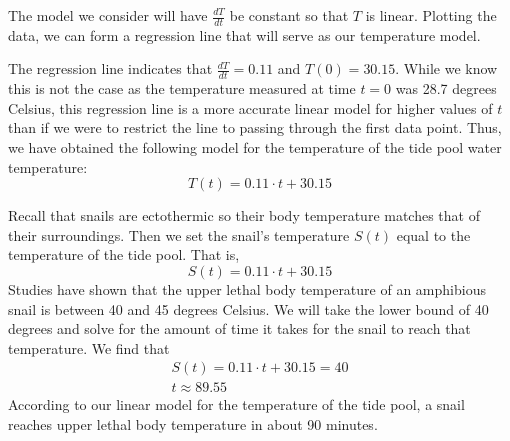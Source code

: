 \documentclass{article}
\begin{document}
   The model we consider will have \(\frac{dT}{dt}\) be constant so that \(T\) is linear.
   Plotting the data, we can form a regression line that will serve as our temperature model.

   \begin{center}
   \end{center}
   The regression line indicates that \(\frac{dT}{dt} = 0.11\) and \(T(0) = 30.15\).
   While we know this is not the case as the temperature measured at time \(t=0\) was 28.7 degrees Celsius,
   this regression line is a more accurate linear model for higher values of \(t\) than if we were to restrict the line to passing through the first data point.
   Thus, we have obtained the following model for the temperature of the tide pool water temperature:
   \begin{equation*}
     T(t) = 0.11 \cdot t + 30.15
   \end{equation*}

   Recall that snails are ectothermic so their body temperature matches that of their surroundings.
   Then we set the snail's temperature \(S(t)\) equal to the temperature of the tide pool.
   That is,
   \begin{equation*}
     S(t) = 0.11 \cdot t + 30.15
   \end{equation*}
   Studies have shown that the upper lethal body temperature of an amphibious snail is between 40 and 45 degrees Celsius.
   We will take the lower bound of 40 degrees and solve for the amount of time it takes for the snail to reach that temperature.
   We find that
   \begin{gather*}
     S(t) = 0.11 \cdot t + 30.15 = 40 \\
     t \approx 89.55
   \end{gather*}
   According to our linear model for the temperature of the tide pool, a snail reaches upper lethal body temperature in about 90 minutes.
\end{document}
